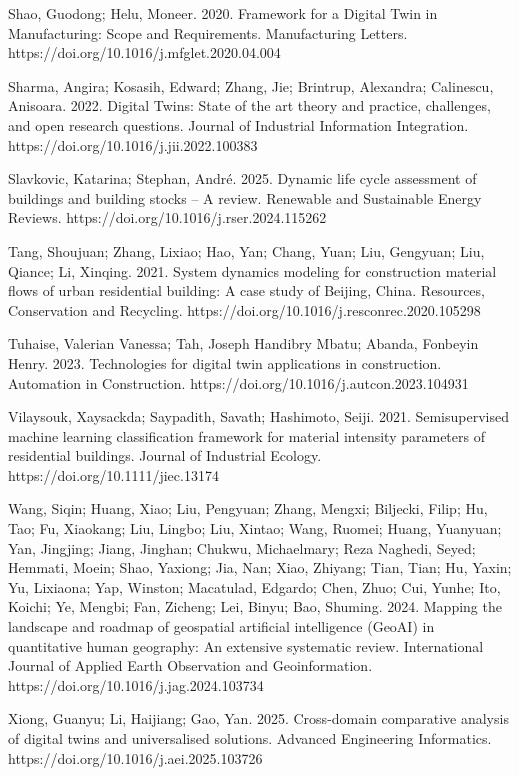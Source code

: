 Shao, Guodong; Helu, Moneer. 2020. Framework for a Digital Twin in Manufacturing: Scope and Requirements. Manufacturing Letters. https://doi.org/10.1016/j.mfglet.2020.04.004

Sharma, Angira; Kosasih, Edward; Zhang, Jie; Brintrup, Alexandra; Calinescu, Anisoara. 2022. Digital Twins: State of the art theory and practice, challenges, and open research questions. Journal of Industrial Information Integration. https://doi.org/10.1016/j.jii.2022.100383

Slavkovic, Katarina; Stephan, André. 2025. Dynamic life cycle assessment of buildings and building stocks -- A review. Renewable and Sustainable Energy Reviews. https://doi.org/10.1016/j.rser.2024.115262

Tang, Shoujuan; Zhang, Lixiao; Hao, Yan; Chang, Yuan; Liu, Gengyuan; Liu, Qiance; Li, Xinqing. 2021. System dynamics modeling for construction material flows of urban residential building: A case study of Beijing, China. Resources, Conservation and Recycling. https://doi.org/10.1016/j.resconrec.2020.105298

Tuhaise, Valerian Vanessa; Tah, Joseph Handibry Mbatu; Abanda, Fonbeyin Henry. 2023. Technologies for digital twin applications in construction. Automation in Construction. https://doi.org/10.1016/j.autcon.2023.104931

Vilaysouk, Xaysackda; Saypadith, Savath; Hashimoto, Seiji. 2021. Semisupervised machine learning classification framework for material intensity parameters of residential buildings. Journal of Industrial Ecology. https://doi.org/10.1111/jiec.13174

Wang, Siqin; Huang, Xiao; Liu, Pengyuan; Zhang, Mengxi; Biljecki, Filip; Hu, Tao; Fu, Xiaokang; Liu, Lingbo; Liu, Xintao; Wang, Ruomei; Huang, Yuanyuan; Yan, Jingjing; Jiang, Jinghan; Chukwu, Michaelmary; Reza Naghedi, Seyed; Hemmati, Moein; Shao, Yaxiong; Jia, Nan; Xiao, Zhiyang; Tian, Tian; Hu, Yaxin; Yu, Lixiaona; Yap, Winston; Macatulad, Edgardo; Chen, Zhuo; Cui, Yunhe; Ito, Koichi; Ye, Mengbi; Fan, Zicheng; Lei, Binyu; Bao, Shuming. 2024. Mapping the landscape and roadmap of geospatial artificial intelligence (GeoAI) in quantitative human geography: An extensive systematic review. International Journal of Applied Earth Observation and Geoinformation. https://doi.org/10.1016/j.jag.2024.103734

Xiong, Guanyu; Li, Haijiang; Gao, Yan. 2025. Cross-domain comparative analysis of digital twins and universalised solutions. Advanced Engineering Informatics. https://doi.org/10.1016/j.aei.2025.103726

